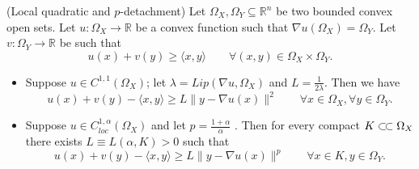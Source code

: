 \documentclass[reqno,12pt]{article}
\newcommand{\ssubset}{\subset\joinrel\subset}
\begin{document}
\begin{lemma} (Local quadratic and $p$-detachment)
\label{lem:Detach_local}
Let $\Omega_X, \Omega_Y \subseteq \mathbb{R}^{n}$ be two bounded convex open sets. Let $u:\Omega_X \to \mathbb{R}$ be a convex function such that $\nabla u (\Omega_X)=\Omega_Y$. Let $v:\Omega_Y \to \mathbb{R}$ be such that
\begin{equation}\label{eqn:uvOmegalocal} u(x) + v(y) \geqslant \langle x, y \rangle \qquad \forall (x,y) \in \Omega_X \times \Omega_Y.\end{equation}
\begin{itemize}
\item[(i)] Suppose $u \in C^{1,1}(\Omega_X)$; let $\lambda= Lip(\nabla u, \Omega_X)$ and $L=\frac 1{2 \lambda}$. Then we have
\begin{equation}
\label{eqn:local2detachement} 
u(x) + v(y) -\langle x, y \rangle \geqslant  L \| y- \nabla u (x) \|^2 \qquad \forall x \in \Omega_X , \forall y \in \Omega_Y.
\end{equation}
    \item[(ii)] Suppose $u \in C^{1, \alpha}_{loc}(\Omega_X)$ and let $p=\frac {1+\alpha}{\alpha}$ . Then for every compact $K \ssubset \Omega_X $ there exists $L\equiv L(\alpha,K)>0$ such that
\begin{equation}
\label{eqn:localpdetachement} 
u(x) + v(y) -\langle x, y \rangle \geqslant  L \| y- \nabla u (x) \|^p \qquad \forall x \in K , y \in \Omega_Y.
\end{equation}
 
    
\end{itemize}
\end{lemma}
\end{document}
